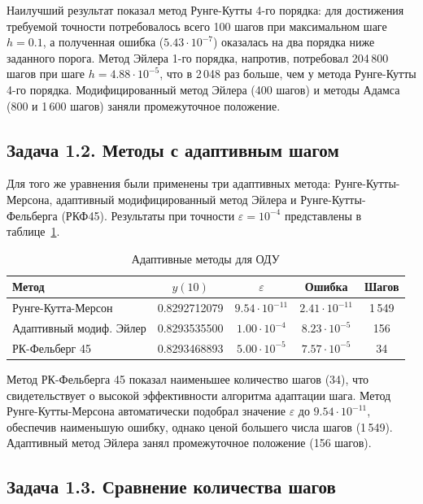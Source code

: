 \documentclass[a4paper]{article}
\begin{document}
Наилучший результат показал метод Рунге-Кутты 4-го порядка: для достижения требуемой точности потребовалось всего 100 шагов при максимальном шаге $h = 0.1$, а полученная ошибка ($5.43\cdot10^{-7}$) оказалась на два порядка ниже заданного порога. Метод Эйлера 1-го порядка, напротив, потребовал 204\,800 шагов при шаге $h = 4.88\cdot10^{-5}$, что в 2\,048 раз больше, чем у метода Рунге-Кутты 4-го порядка. Модифицированный метод Эйлера (400 шагов) и методы Адамса (800 и 1\,600 шагов) заняли промежуточное положение.

\subsection*{Задача 1.2. Методы с адаптивным шагом}

Для того же уравнения были применены три адаптивных метода: Рунге-Кутты-Мерсона, адаптивный модифицированный метод Эйлера и Рунге-Кутты-Фельберга (РКФ45). Результаты при точности $\varepsilon = 10^{-4}$ представлены в таблице~\ref{tab:task1_adaptive}.

\begin{table}[H]
\centering
\caption{Адаптивные методы для ОДУ}
\label{tab:task1_adaptive}
\begin{tabular}{|l|c|c|c|c|}
\hline
\textbf{Метод} & \textbf{$y(10)$} & \textbf{$\varepsilon$} & \textbf{Ошибка} & \textbf{Шагов} \\
\hline
Рунге-Кутта-Мерсон     & 0.8292712079 & $9.54\cdot10^{-11}$ & $2.41\cdot10^{-11}$ & 1\,549 \\
Адаптивный модиф. Эйлер & 0.8293535500 & $1.00\cdot10^{-4}$   & $8.23\cdot10^{-5}$  & 156 \\
РК-Фельберг 45         & 0.8293468893 & $5.00\cdot10^{-5}$   & $7.57\cdot10^{-5}$  & 34 \\
\hline
\end{tabular}
\end{table}

Метод РК-Фельберга 45 показал наименьшее количество шагов (34), что свидетельствует о высокой эффективности алгоритма адаптации шага. Метод Рунге-Кутты-Мерсона автоматически подобрал значение $\varepsilon$ до $9.54\cdot10^{-11}$, обеспечив наименьшую ошибку, однако ценой большего числа шагов (1\,549). Адаптивный метод Эйлера занял промежуточное положение (156 шагов).

\subsection*{Задача 1.3. Сравнение количества шагов}
\end{document}
